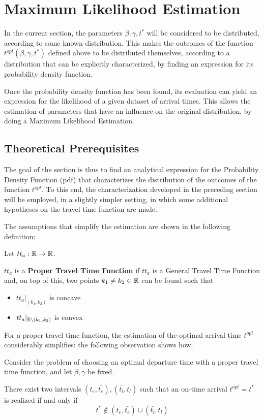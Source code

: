 \section{Maximum Likelihood Estimation}

In the current section,
the parameters \(\beta, \gamma, t^*\) will be considered to be distributed, according to some known distribution.
This makes the outcomes of the function \(t^{opt}(\beta, \gamma, t^*)\) defined above to be distributed themselves,
according to a distribution that can be explicitly characterized,
by finding an expression for its probability density function.

Once the probability density function has been found,
its evaluation can yield an expression for the likelihood of a given dataset of arrival times.
This allows the estimation of parameters that have an influence on the original distribution,
by doing a Maximum Likelihood Estimation.

\subsection{Theoretical Prerequisites}


The goal of the section is thus to find an analytical expression for the Probability Density Function (pdf) that characterizes the distribution of the outcomes of the function \(t^{opt}\).
To this end, the characterization developed in the preceding section will be employed,
in a slightly simpler setting, in which some additional hypotheses on the travel time function are made.

The assumptions that simplify the estimation are shown in the following definition:
\begin{definition}
  \label{def:proper_tt}
  Let \(tt_a:\mathbb{R}\rightarrow\mathbb{R}\).

  \(tt_a\) is a \textbf{Proper Travel Time Function} if \(tt_a\) is a General Travel Time Function and,
  on top of this, 
  two points \(k_1\neq k_2 \in \mathbb{R}\) can be found such that
  \begin{itemize}
  \item \(tt_a|_{(k_1, k_2)}\) is concave
  \item \(tt_a|_{\mathbb{R}\setminus(k_1, k_2)}\) is convex
  \end{itemize}
\end{definition}

For a proper travel time function,
the estimation of the optimal arrival time \(t^{opt}\) considerably simplifies:
the following observation shows how.
\begin{obs}
  \label{obs:simplified-char}
  Consider the problem of choosing an optimal departure time
  with a proper travel time function, and let \(\beta, \gamma\) be fixed.

  There exist two intervals \((t_e, \bar{t_e}), (\bar{t_l}, t_l)\) such that an on-time arrival \(t^{opt} = t^*\) is realized if and only if
  \begin{equation*}
    t^* \notin (t_e, \bar{t_e}) \cup (\bar{t_l}, t_l)
  \end{equation*}
\end{obs}

